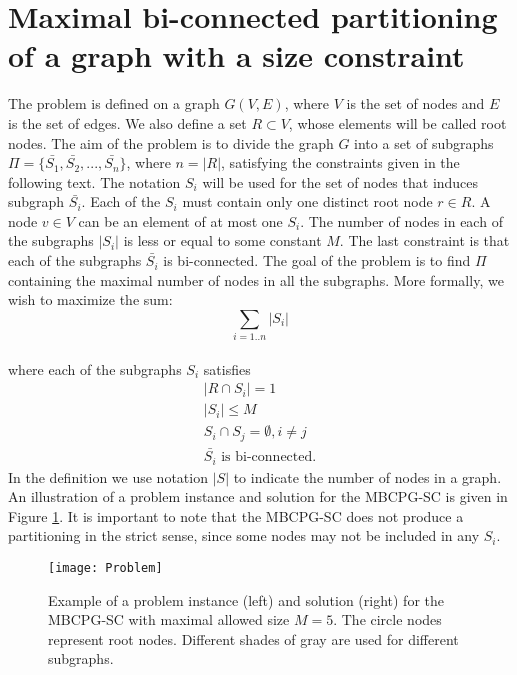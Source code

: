 \section{Maximal bi-connected partitioning of a graph with a size constraint}
The problem is defined on a graph $G(V,E)$, where $V$ is the set of nodes and $E$ is the set of edges. We also define a set $R \subset V$, whose elements  will be called root nodes. The aim of the problem is to divide the graph $G$ into a set of subgraphs $\Pi = \{\bar{S_1}, \bar{S_2},..., \bar{S_n}\}$, where  $n = |R|$, satisfying the  constraints given in the following text. The notation $S_i$ will be used for the set of nodes that induces subgraph $\bar{S_i}$.  Each of the $S_i$ must contain only one distinct root node $r \in R$. A node $v \in V$ can be an element of at most one $S_i$. The number of nodes in each of the subgraphs $|S_i|$ is less or equal to some constant $M$. The last constraint is that each of the subgraphs $\bar{S_i}$ is bi-connected. The goal of the problem is to find $\Pi$ containing the maximal number of nodes in all the subgraphs.  More formally, we wish to maximize the  sum:
\begin{equation}
\label{ProbSum}
 \sum_{i= 1..n} |S_i|
\end{equation}\\
where each of the subgraphs $S_i$ satisfies 
\begin{eqnarray}
|R \cap S_i | = 1 \\
|S_i| \leq M\\
S_i \cap S_j = \emptyset, i \neq j\\
\bar{S_i} \text{ is bi-connected}.
\end{eqnarray}
In the definition we use notation $|S|$ to indicate the number of nodes in a graph. An illustration of a problem instance and solution for the MBCPG-SC is given in Figure \ref{fig:ProblemColor}. It is important to note that the MBCPG-SC does not produce a partitioning in the strict sense, since some nodes may not be included in any $S_i$.

\begin{figure}[tcb]
\centering
\texttt{[image: Problem]}
\caption{Example of a problem instance (left) and solution (right) for the MBCPG-SC with maximal allowed size $M = 5$. The circle nodes represent root nodes.  Different shades of gray  are used for different subgraphs.}
\label{fig:ProblemColor}
\end{figure} 

